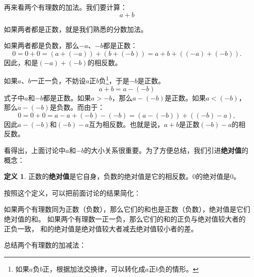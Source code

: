 \documentclass[12pt,UTF8]{ctexbook}
\theoremstyle{definition}
\newtheorem{df}{定义}[section]
\theoremstyle{plain}
\begin{document}
再来看两个有理数的加法。我们要计算：
$$ a + b $$

如果两者都是正数，就是我们熟悉的分数加法。

如果两者都是负数，那么$-a$、$-b$都是正数：
$$ 0 = 0 + 0 = (a +(-a)) + (b + (-b)) = a + b + \left((-a) + (-b)\right).$$
因此，和是$(-a) + (-b)$的相反数。

如果$a$、$b$一正一负，不妨设$a$正$b$负\footnote{如果$a$负$b$正，根据加法交换律，可以转化成$a$正$b$负的情形。}，于是$-b$是正数。
$$ a + b = a - (-b)$$
式子中$a$和$-b$都是正数。如果$a > -b$，那么$a - (-b)$是正数。如果$a < (-b)$，那么$a - (-b)$是负数。而由于：
$$ 0 = 0 + 0 = a - a + (-b) - (-b) = \left(a - (-b)\right) + \left((-b) - a\right),$$
因此$a - (-b)$和$(-b) - a$互为相反数。也就是说，$a + b$是正数$(-b) - a$的相反数。

看得出，上面讨论中$a$和$-b$的大小关系很重要。为了方便总结，我们引进\textbf{绝对值}的概念：
\begin{df}\label{df:3-0-0}
    正数的\textbf{绝对值}是它自身，负数的绝对值是它的相反数。$0$的绝对值是$0$。
\end{df}
按照这个定义，可以把前面讨论的结果简化：

如果两个有理数同为正数（负数），那么它们的和也是正数（负数），绝对值是它们绝对值的和。
如果两个有理数一正一负，那么它们的和的正负与绝对值较大者的正负一致，
和的绝对值是绝对值较大者减去绝对值较小者的差。

总结两个有理数的加减法：
\begin{center}
\end{center}
\end{document}
